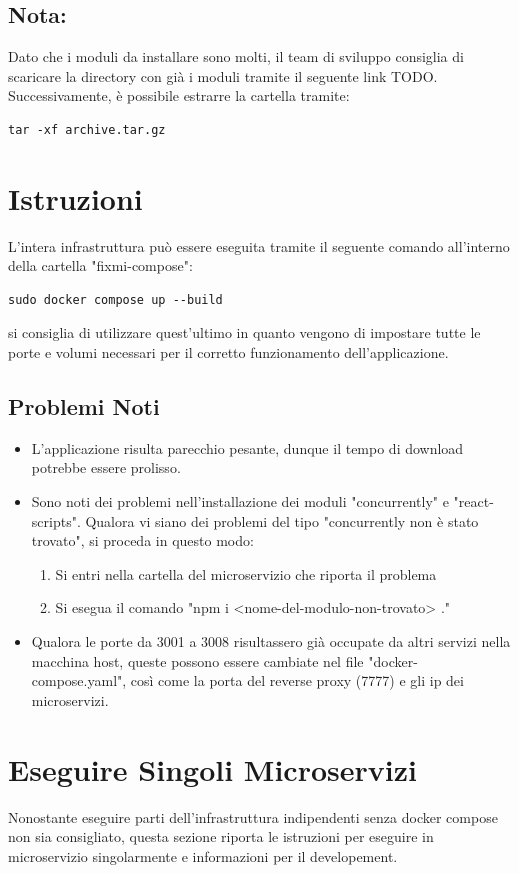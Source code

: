 \documentclass{report}
\begin{document}
\subsection*{Nota:}
Dato che i moduli da installare sono molti, il team di sviluppo consiglia di scaricare la directory con già i moduli tramite il seguente link TODO.
Successivamente, è possibile estrarre la cartella tramite:
\begin{verbatim}
tar -xf archive.tar.gz
\end{verbatim}

\section{Istruzioni}
L'intera infrastruttura può essere eseguita tramite il seguente comando all'interno della cartella "fixmi-compose":
\begin{verbatim}
sudo docker compose up --build
\end{verbatim}
si consiglia di utilizzare quest'ultimo in quanto vengono di impostare tutte le porte e volumi necessari per il corretto funzionamento dell'applicazione.
\subsection*{Problemi Noti}
\begin{itemize}
	\item L'applicazione risulta parecchio pesante, dunque il tempo di download potrebbe essere prolisso.
	\item Sono noti dei problemi nell'installazione dei moduli "concurrently" e "react-scripts". Qualora vi siano dei problemi del tipo "concurrently non è stato trovato", si proceda in questo modo:
	      \begin{enumerate}
		      \item Si entri nella cartella del microservizio che riporta il problema
		      \item Si esegua il comando "npm i <nome-del-modulo-non-trovato> ."
	      \end{enumerate}
	\item Qualora le porte da 3001 a 3008 risultassero già occupate da altri servizi nella macchina host, queste possono essere cambiate nel file "docker-compose.yaml", così come la porta del reverse proxy (7777) e gli ip dei microservizi.
\end{itemize}

\section{Eseguire Singoli Microservizi}
Nonostante eseguire parti dell'infrastruttura indipendenti senza docker compose non sia consigliato, questa sezione riporta le istruzioni per eseguire in microservizio singolarmente e informazioni per il developement.
\end{document}
